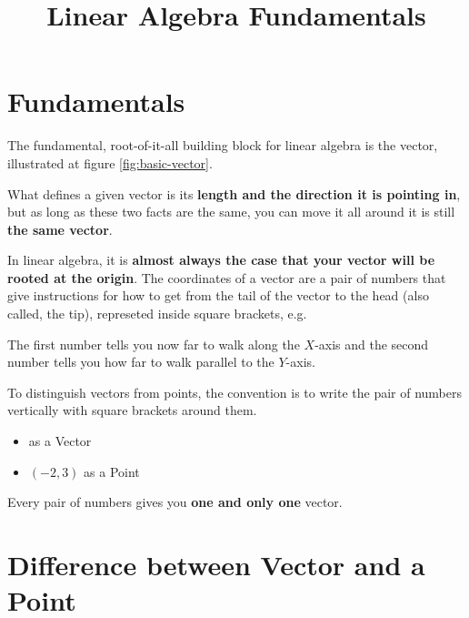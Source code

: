 \documentclass{article}
\title{Linear Algebra Fundamentals}
\date{}
\begin{document}
    \maketitle

    \tableofcontents

\newpage

\section{Fundamentals}

The fundamental, root-of-it-all building block for linear algebra is the vector, illustrated at figure \ref{fig:basic-vector}.


What defines a given vector is its \textbf{length and the direction it is pointing in}, but as long as these two facts are the same, you can move it all around it is still \textbf{the same vector}.


In linear algebra, it is \textbf{almost always the case that your vector will be rooted at the origin}. The coordinates of a vector are a pair of numbers that give instructions for how to get from the tail of the vector to the head (also called, the tip), represeted inside square brackets, e.g. 

The first number tells you now far to walk along the \(X\)-axis and the second number tells you how far to walk parallel to the \(Y\)-axis.

To distinguish vectors from points, the convention is to write the pair of numbers vertically with square brackets around them.

\begin{itemize}
    \item {} as a Vector
    \item \( (-2, 3) \) as a Point
\end{itemize}

Every pair of numbers gives you \textbf{one and only one} vector.


\section{Difference between Vector and a Point}
\end{document}
